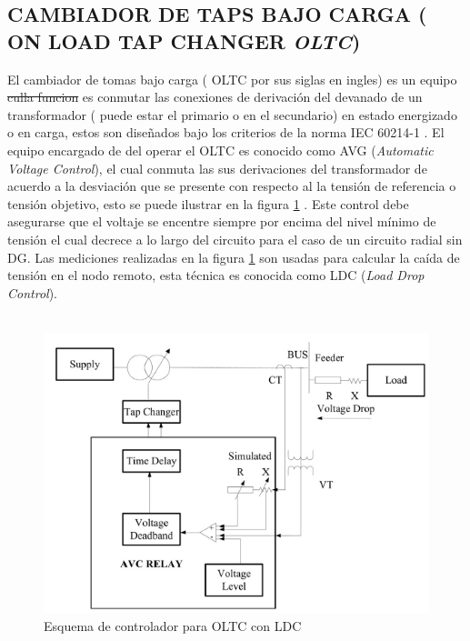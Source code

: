 \documentclass[12pt, letterpaper]{report}
\providecommand{\DIFaddtex}[1]{{\protect\color{blue}\uwave{#1}}} %
\providecommand{\DIFdeltex}[1]{{\protect\color{red}\sout{#1}}}                      %
\providecommand{\DIFaddbegin}{} %
\providecommand{\DIFaddend}{} %
\providecommand{\DIFdelbegin}{} %
\providecommand{\DIFdelend}{} %
\providecommand{\DIFadd}[1]{\texorpdfstring{\DIFaddtex{#1}}{#1}} %
\providecommand{\DIFdel}[1]{\texorpdfstring{\DIFdeltex{#1}}{}} %
\newcommand{\DIFscaledelfig}{0.5}
\newlength{\DIFdelgraphicswidth} %
\newlength{\DIFdelgraphicsheight} %
\newcommand{\DIFaddincludegraphics}[2][]{{\color{blue}\fbox{\DIFOincludegraphics[#1]{#2}}}} %
\newcommand{\DIFdelincludegraphics}[2][]{%
\sbox{\DIFdelgraphicsbox}{\DIFOincludegraphics[#1]{#2}}%
\settoboxwidth{\DIFdelgraphicswidth}{\DIFdelgraphicsbox} %
\settoboxtotalheight{\DIFdelgraphicsheight}{\DIFdelgraphicsbox} %
\scalebox{\DIFscaledelfig}{%
\parbox[b]{\DIFdelgraphicswidth}{\usebox{\DIFdelgraphicsbox}\\[-\baselineskip] \rule{\DIFdelgraphicswidth}{0em}}\llap{\resizebox{\DIFdelgraphicswidth}{\DIFdelgraphicsheight}{%
\setlength{\unitlength}{\DIFdelgraphicswidth}%
\begin{picture}(1,1)%
\thicklines\linethickness{2pt} %
{\color[rgb]{1,0,0}\put(0,0){\framebox(1,1){}}}%
{\color[rgb]{1,0,0}\put(0,0){\line( 1,1){1}}}%
{\color[rgb]{1,0,0}\put(0,1){\line(1,-1){1}}}%
\end{picture}%
}\hspace*{3pt}}} %
} %
\DeclareRobustCommand{\DIFaddbegin}{\DIFOaddbegin \let\includegraphics\DIFaddincludegraphics} %
\DeclareRobustCommand{\DIFaddend}{\DIFOaddend \let\includegraphics\DIFOincludegraphics} %
\DeclareRobustCommand{\DIFdelbegin}{\DIFOdelbegin \let\includegraphics\DIFdelincludegraphics} %
\DeclareRobustCommand{\DIFdelend}{\DIFOaddend \let\includegraphics\DIFOincludegraphics} %
\begin{document}
 \subsection{CAMBIADOR DE TAPS BAJO CARGA ( ON LOAD TAP CHANGER \textit{OLTC})}
El cambiador de tomas bajo carga ( OLTC por sus siglas en ingles) es un equipo  \DIFdelbegin \DIFdel{culla funcion }\DIFdelend \DIFaddbegin \DIFadd{cuya función }\DIFaddend es conmutar las conexiones de derivación del devanado de un transformador ( puede estar el primario o en el secundario) en estado energizado o en carga, estos son diseñados bajo los criterios de la norma IEC 60214-1 \cite{IEC60214}.
El equipo encargado de del operar el OLTC es conocido como AVG (\textit{Automatic Voltage Control}), el cual conmuta las sus derivaciones del transformador de acuerdo a la desviación que se presente con respecto al la tensión de referencia o tensión objetivo, esto se puede ilustrar en la figura \ref{fig:esqusema_LDC} \cite{Sarimuthu2016}. Este control debe asegurarse que el voltaje se encentre siempre por encima del nivel mínimo de tensión el cual decrece a lo largo del circuito \cite{Sarimuthu2016} para el caso de un circuito radial sin DG. Las  mediciones realizadas en la figura \ref{fig:esqusema_LDC} son usadas para calcular la caída de tensión en el nodo remoto, esta técnica es conocida como LDC (\textit{Load Drop Control}).\\\\

\begin{figure}[h]
\centering
\caption{Esquema de controlador para OLTC con LDC \cite{Sarimuthu2016}}
\label{fig:esqusema_LDC}
\includegraphics[width=0.7\linewidth]{imagenes/cap_2/LDC}
\end{figure}
\end{document}
